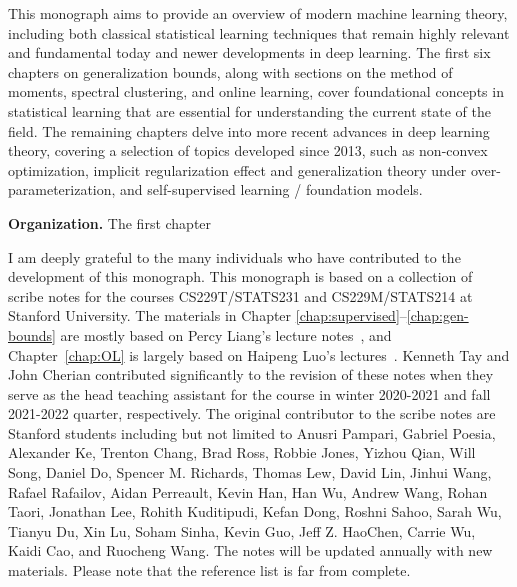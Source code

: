 \setcounter{page}{5}

This monograph aims to provide an overview of modern machine learning theory, including both classical statistical learning techniques that remain highly relevant and fundamental today and newer developments in deep learning. The first six chapters on generalization bounds, along with sections on the method of moments, spectral clustering, and online learning, cover foundational concepts in statistical learning that are essential for understanding the current state of the field. The remaining chapters delve into more recent advances in deep learning theory, covering a selection of topics developed since 2013, such as non-convex optimization, implicit regularization effect and generalization theory under over-parameterization, and self-supervised learning / foundation models.

{\bf Organization.} The first chapter 








\sloppy I am deeply grateful to the many individuals who have contributed to the development of this monograph. This monograph is based on a collection of scribe notes for the courses CS229T/STATS231 and CS229M/STATS214 at Stanford University. The materials in Chapter \ref{chap:supervised}--\ref{chap:gen-bounds} are mostly based on Percy Liang's lecture notes~\citep{percynotes}, and Chapter~\ref{chap:OL} is largely based on Haipeng Luo's lectures~\cite{haipengnotes}. Kenneth Tay and John Cherian contributed significantly to the revision of these notes when they serve as the head teaching assistant for the course in winter 2020-2021 and fall 2021-2022 quarter, respectively. The original contributor to the scribe notes are Stanford students including but not limited to Anusri Pampari, Gabriel Poesia, Alexander Ke, Trenton Chang, Brad Ross, Robbie Jones, Yizhou Qian, Will Song, Daniel Do, Spencer M. Richards, Thomas Lew, David Lin, Jinhui Wang, Rafael Rafailov, Aidan Perreault, Kevin Han, Han Wu, Andrew Wang, Rohan Taori, Jonathan Lee, Rohith Kuditipudi, Kefan Dong, Roshni Sahoo, Sarah Wu, Tianyu Du, Xin Lu, Soham Sinha, Kevin Guo, Jeff Z. HaoChen, Carrie Wu, Kaidi Cao, and Ruocheng Wang.  The notes will be updated annually with new materials.  Please note that the reference list is far from complete.

